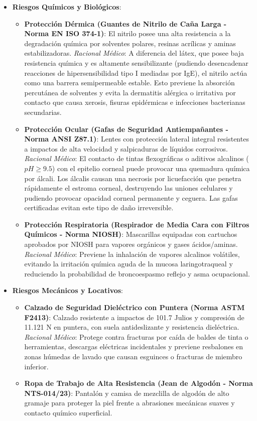 \documentclass[11pt, letterpaper]{article}
\begin{document}
\begin{itemize}
    \item \textbf{Riesgos Químicos y Biológicos}: 
    \begin{itemize}
        \item \textbf{Protección Dérmica (Guantes de Nitrilo de Caña Larga - Norma EN ISO 374-1)}: El nitrilo posee una alta resistencia a la degradación química por solventes polares, resinas acrílicas y aminas estabilizadoras. \textit{Racional Médico}: A diferencia del látex, que posee baja resistencia química y es altamente sensibilizante (pudiendo desencadenar reacciones de hipersensibilidad tipo I mediadas por IgE), el nitrilo actúa como una barrera semipermeable estable. Esto previene la absorción percutánea de solventes y evita la dermatitis alérgica o irritativa por contacto que causa xerosis, fisuras epidérmicas e infecciones bacterianas secundarias.
        \item \textbf{Protección Ocular (Gafas de Seguridad Antiempañantes - Norma ANSI Z87.1)}: Lentes con protección lateral integral resistentes a impactos de alta velocidad y salpicaduras de líquidos corrosivos. \textit{Racional Médico}: El contacto de tintas flexográficas o aditivos alcalinos ($pH \geq 9.5$) con el epitelio corneal puede provocar una quemadura química por álcali. Los álcalis causan una necrosis por licuefacción que penetra rápidamente el estroma corneal, destruyendo las uniones celulares y pudiendo provocar opacidad corneal permanente y ceguera. Las gafas certificadas evitan este tipo de daño irreversible.
        \item \textbf{Protección Respiratoria (Respirador de Media Cara con Filtros Químicos - Norma NIOSH)}: Mascarillas equipadas con cartuchos aprobados por NIOSH para vapores orgánicos y gases ácidos/aminas. \textit{Racional Médico}: Previene la inhalación de vapores alcalinos volátiles, evitando la irritación química aguda de la mucosa laringotraqueal y reduciendo la probabilidad de broncoespasmo reflejo y asma ocupacional.
    \end{itemize}
    
    \item \textbf{Riesgos Mecánicos y Locativos}:
    \begin{itemize}
        \item \textbf{Calzado de Seguridad Dieléctrico con Puntera (Norma ASTM F2413)}: Calzado resistente a impactos de 101.7 Julios y compresión de 11.121 N en puntera, con suela antideslizante y resistencia dieléctrica. \textit{Racional Médico}: Protege contra fracturas por caída de baldes de tinta o herramientas, descargas eléctricas incidentales y previene resbalones en zonas húmedas de lavado que causan esguinces o fracturas de miembro inferior.
        \item \textbf{Ropa de Trabajo de Alta Resistencia (Jean de Algodón - Norma NTS-014/23)}: Pantalón y camisa de mezclilla de algodón de alto gramaje para proteger la piel frente a abrasiones mecánicas suaves y contacto químico superficial.
    \end{itemize}
    

\end{itemize}
\end{document}
